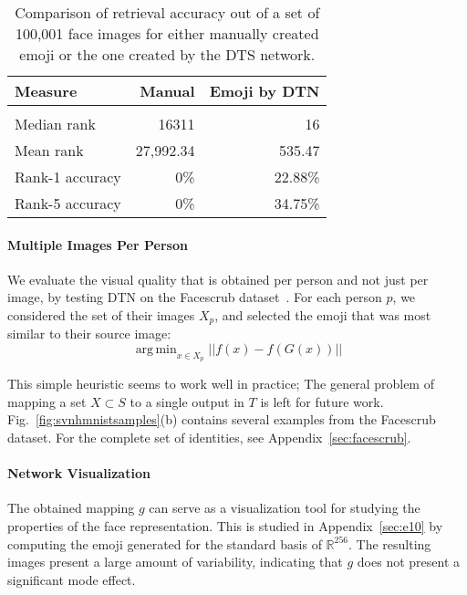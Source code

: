 \documentclass{article} \usepackage{iclr2017_conference,times}
\DeclareMathOperator*{\argmin}{arg\,min}
\begin{document}
\begin{table}[t]
\caption{Comparison of retrieval accuracy out of a set of 100,001 face images for either manually created emoji or the one created by the DTS network.}
\label{tab:BvsG}
\begin{center}
\begin{tabular}{lrr}
Measure & Manual & Emoji by DTN\\ \hline \\
Median rank & 16311 & 16\\
Mean rank & 27,992.34 & 535.47\\
Rank-1 accuracy & 0\% & 22.88\% \\
Rank-5 accuracy & 0\% & 34.75\% \\
\hline
\end{tabular}
\end{center}
\end{table}

\paragraph{Multiple Images Per Person} We evaluate the visual quality that is obtained per person and not just per image, by testing DTN on the Facescrub dataset~\citep{facescrub}. For each person $p$, we considered the set of their images $X_p$, and  selected the emoji that was most similar to their source image:
\begin{equation}
\label{eq:mmeq}
\argmin_{x \in X_p} || f(x)-f(G(x))|| 
\end{equation}

This simple heuristic seems to work well in practice; The general problem of mapping a set $X \subset S$ to a single output in $T$ is left for future work.  Fig.~\ref{fig:svnhmnistsamples}(b) contains several examples from the Facescrub dataset. For the complete set of identities, see Appendix~\ref{sec:facescrub}.

\paragraph{Network Visualization} The obtained mapping $g$ can serve as a visualization tool for studying the properties of the face representation. This is studied in Appendix~\ref{sec:e10} by computing the emoji generated for the standard basis of $\mathbb{R}^{256}$. The resulting images present a large amount of variability, indicating that $g$ does not present a significant mode effect.
\end{document}
